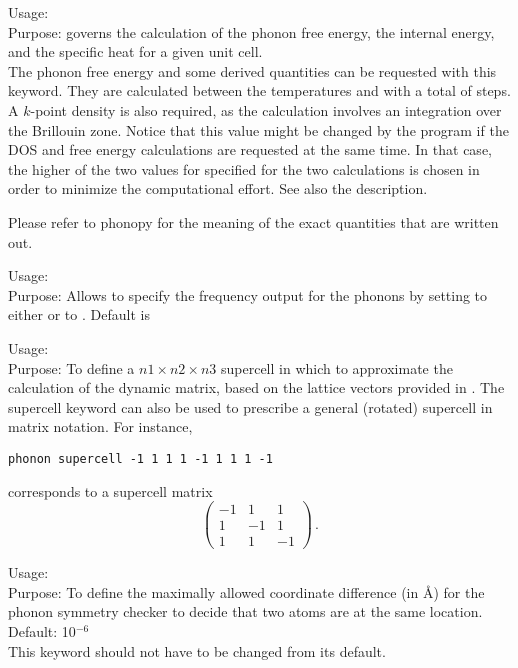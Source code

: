{ Usage:   \\[1.0em]
  Purpose: governs the calculation of the phonon free energy, the
  internal energy, and the specific heat for a given unit cell. \\ } 
The phonon free energy and some derived quantities can be requested
with this keyword. They are 
calculated between the temperatures  and 
with a total of  steps. A $k$-point density  is
also required, as the calculation involves an integration over the
Brillouin zone. Notice that this value might be changed by the program
if the DOS and free energy calculations are requested at the same
time. In that case, the higher of the two values for 
specified for the two calculations is chosen in order to minimize the
computational effort. See also the 
description. 

Please refer to phonopy for the meaning of the exact quantities that
are written out.

{ Usage:   \\[1.0em]
  Purpose: Allows to specify the frequency output for the phonons by
  setting  to either  or to
  . Default is  \\}

{ Usage:   
   
  \\[1.0em]
  Purpose: To define a $n1\times n2\times n3$ supercell in which to
  approximate the calculation of the dynamic matrix, based on the
  lattice vectors provided in . }
The supercell keyword can also be used to prescribe a general (rotated)
supercell in matrix notation. For instance,

\texttt{phonon supercell -1 1 1  1 -1 1  1 1 -1}

corresponds to a supercell matrix
\begin{equation*}
\begin{pmatrix}  
-1 & 1 & 1 \\  1 & -1 & 1 \\  1 & 1 & -1 
\end{pmatrix}  \, .
\end{equation*}

{Usage:  
   \\[1.0em]
Purpose: To define the maximally allowed coordinate difference (in
\AA) for the phonon symmetry checker to decide that two atoms are at
the same location. Default: 10$^{-6}$\\}
This keyword should not have to be changed from its default.\\


